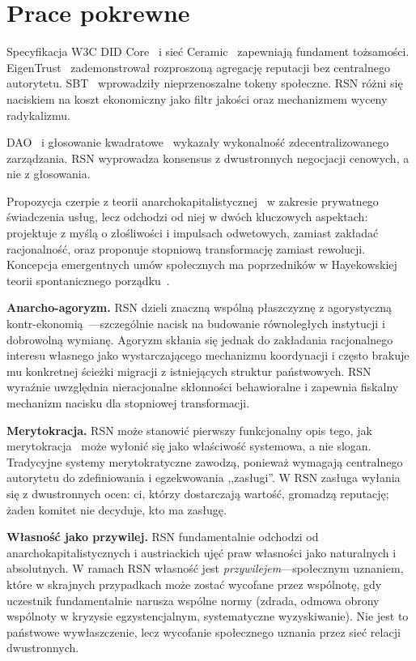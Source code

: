 \documentclass[11pt,a4paper,twocolumn]{article}
\begin{document}
\section{Prace pokrewne}

Specyfikacja W3C DID Core~\cite{did2022} i sieć Ceramic~\cite{ceramic2023} zapewniają fundament tożsamości. EigenTrust~\cite{kamvar2003} zademonstrował rozproszoną agregację reputacji bez centralnego autorytetu. SBT~\cite{weyl2022} wprowadziły nieprzenoszalne tokeny społeczne. RSN różni się naciskiem na koszt ekonomiczny jako filtr jakości oraz mechanizmem wyceny radykalizmu.

DAO~\cite{buterin2014} i głosowanie kwadratowe~\cite{buterin2019} wykazały wykonalność zdecentralizowanego zarządzania. RSN wyprowadza konsensus z dwustronnych negocjacji cenowych, a nie z głosowania.

Propozycja czerpie z teorii anarchokapitalistycznej~\cite{rothbard1973,hoppe2001} w zakresie prywatnego świadczenia usług, lecz odchodzi od niej w dwóch kluczowych aspektach: projektuje z myślą o złośliwości i impulsach odwetowych, zamiast zakładać racjonalność, oraz proponuje stopniową transformację zamiast rewolucji. Koncepcja emergentnych umów społecznych ma poprzedników w Hayekowskiej teorii spontanicznego porządku~\cite{hayek1973}.

\textbf{Anarcho-agoryzm.} RSN dzieli znaczną wspólną płaszczyznę z agorystyczną kontr-ekonomią~\cite{konkin2006}---szczególnie nacisk na budowanie równoległych instytucji i dobrowolną wymianę. Agoryzm skłania się jednak do zakładania racjonalnego interesu własnego jako wystarczającego mechanizmu koordynacji i często brakuje mu konkretnej ścieżki migracji z istniejących struktur państwowych. RSN wyraźnie uwzględnia nieracjonalne skłonności behawioralne i zapewnia fiskalny mechanizm nacisku dla stopniowej transformacji.

\textbf{Merytokracja.} RSN może stanowić pierwszy funkcjonalny opis tego, jak merytokracja~\cite{young1958} może wyłonić się jako właściwość systemowa, a nie slogan. Tradycyjne systemy merytokratyczne zawodzą, ponieważ wymagają centralnego autorytetu do zdefiniowania i egzekwowania ,,zasługi''. W RSN zasługa wyłania się z dwustronnych ocen: ci, którzy dostarczają wartość, gromadzą reputację; żaden komitet nie decyduje, kto ma zasługę.

\textbf{Własność jako przywilej.} RSN fundamentalnie odchodzi od anarchokapitalistycznych i austriackich ujęć praw własności jako naturalnych i absolutnych. W ramach RSN własność jest \emph{przywilejem}---społecznym uznaniem, które w skrajnych przypadkach może zostać wycofane przez wspólnotę, gdy uczestnik fundamentalnie narusza wspólne normy (zdrada, odmowa obrony wspólnoty w kryzysie egzystencjalnym, systematyczne wyzyskiwanie). Nie jest to państwowe wywłaszczenie, lecz wycofanie społecznego uznania przez sieć relacji dwustronnych.
\end{document}
